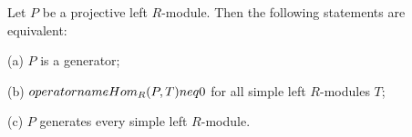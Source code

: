 Let $P$ be a projective left $R$-module. Then the following statements are equivalent:

(a) $P$ is a generator;

(b) $\\operatorname{Hom}_R(P, T) \\neq 0$ for all simple left $R$-modules $T$;

(c) $P$ generates every simple left $R$-module.
